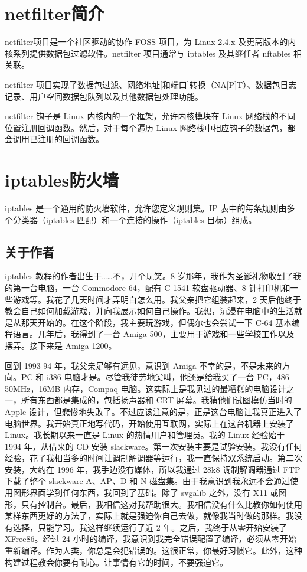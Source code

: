\documentclass[12pt,UTF8]{ctexbook}
\begin{document}
\section{netfilter简介}
netfilter项目是一个社区驱动的协作 FOSS 项目，为 Linux 2.4.x 及更高版本的内核系列提供数据包过滤软件。netfilter 项目通常与 iptables 及其继任者 nftables 相关联。

netfilter 项目实现了数据包过滤、网络地址[和端口]转换（NA[P]T）、数据包日志记录、用户空间数据包队列以及其他数据包处理功能。

netfilter 钩子是 Linux 内核内的一个框架，允许内核模块在 Linux 网络栈的不同位置注册回调函数。然后，对于每个遍历 Linux 网络栈中相应钩子的数据包，都会调用已注册的回调函数。

\section{iptables防火墙}
iptables 是一个通用的防火墙软件，允许您定义规则集。IP 表中的每条规则由多个分类器（iptables 匹配）和一个连接的操作（iptables 目标）组成。

\subsection{关于作者}
iptables 教程的作者出生于……不，开个玩笑。8 岁那年，我作为圣诞礼物收到了我的第一台电脑，一台 Commodore 64，配有 C-1541 软盘驱动器、8 针打印机和一些游戏等。我花了几天时间才弄明白怎么用。我父亲把它组装起来，2 天后他终于教会自己如何加载游戏，并向我展示如何自己操作。我想，沉浸在电脑中的生活就是从那天开始的。在这个阶段，我主要玩游戏，但偶尔也会尝试一下 C-64 基本编程语言。几年后，我得到了一台 Amiga 500，主要用于游戏和一些学校工作以及摆弄。接下来是 Amiga 1200。

回到 1993-94 年，我父亲足够有远见，意识到 Amiga 不幸的是，不是未来的方向。PC 和 i386 电脑才是。尽管我徒劳地尖叫，他还是给我买了一台 PC，486 50MHz，16MB 内存，Compaq 电脑。这实际上是我见过的最糟糕的电脑设计之一，所有东西都是集成的，包括扬声器和 CRT 屏幕。我猜他们试图模仿当时的 Apple 设计，但悲惨地失败了。不过应该注意的是，正是这台电脑让我真正进入了电脑世界。我开始真正地写代码，开始使用互联网，实际上在这台机器上安装了 Linux。我长期以来一直是 Linux 的热情用户和管理员。我的 Linux 经验始于 1994 年，从借来的 CD 安装 slackware。第一次安装主要是试验安装。我没有任何经验，花了我相当多的时间让调制解调器等运行，我一直保持双系统启动。第二次安装，大约在 1996 年，我手边没有媒体，所以我通过 28k8 调制解调器通过 FTP 下载了整个 slackware A、AP、D 和 N 磁盘集。由于我意识到我永远不会通过使用图形界面学到任何东西，我回到了基础。除了 svgalib 之外，没有 X11 或图形，只有控制台。最后，我相信这对我帮助很大。我相信没有什么比教你如何使用某样东西更好的方法了，实际上就是强迫你自己去做，就像我当时做的那样。我没有选择，只能学习。我这样继续运行了近 2 年。之后，我终于从零开始安装了 XFree86。经过 24 小时的编译，我意识到我完全错误配置了编译，必须从零开始重新编译。作为人类，你总是会犯错误的。这很正常，你最好习惯它。此外，这种构建过程教会你要有耐心。让事情有它的时间，不要强迫它。
\end{document}
